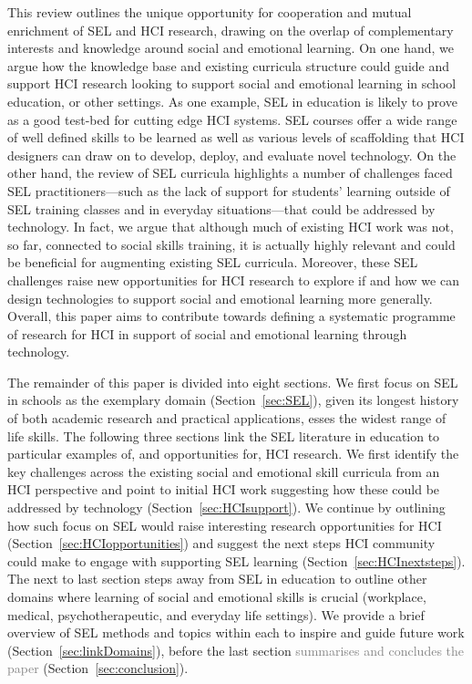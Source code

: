 \documentclass[prodmode,acmtochi]{acmsmall}
\newcommand{\rephrase}[1]{\textrm{\textrm{\textcolor{gray}{#1}}}}
\begin{document}
This review outlines the unique opportunity for cooperation and mutual enrichment of SEL and HCI research, drawing on the overlap of complementary interests and knowledge around social and emotional learning. 
%
On one hand, we argue how the knowledge base and existing curricula structure could guide and support HCI research looking to support social and emotional learning in school education, or other settings. As one example, SEL in education is likely to prove as a good test-bed for cutting edge HCI systems. SEL courses offer a wide range of well defined skills to be learned as well as various levels of scaffolding that HCI designers can draw on to develop, deploy, and evaluate novel technology. 
On the other hand, the review of SEL curricula highlights a number of challenges faced SEL practitioners---such as the lack of support for students' learning outside of SEL training classes and in everyday situations---that could be addressed by technology. In fact, we argue that although much of existing HCI work was not, so far, connected to social skills training, it is actually highly relevant and could be beneficial for augmenting existing SEL curricula. Moreover, these SEL challenges raise new opportunities for HCI research to explore if and how we can design technologies to support social and emotional learning more generally. 
%
Overall, this paper aims to contribute towards defining a systematic programme of research for HCI in support of social and emotional learning through technology. 

The remainder of this paper is divided into eight sections.  We first focus on SEL in schools as the exemplary domain (Section~\ref{sec:SEL}), given its longest history of both academic research and practical applications, esses the widest range of life skills. The following three sections link the SEL literature in education to particular examples of, and opportunities for, HCI research. We first  identify the key challenges across the existing social and emotional skill curricula from an HCI perspective and point to initial HCI work suggesting how these could be addressed by technology (Section~\ref{sec:HCIsupport}). We continue by outlining how such focus on SEL would raise interesting research opportunities for HCI (Section~\ref{sec:HCIopportunities}) and suggest the next steps HCI community could make to engage with supporting SEL learning (Section~\ref{sec:HCInextsteps}). 
The next to last section steps away from SEL in education to outline other domains where learning of social and emotional skills is crucial (workplace, medical, psychotherapeutic, and everyday life settings). We provide a brief overview of SEL methods and topics within each to inspire and guide future work (Section~\ref{sec:linkDomains}), before the last section \rephrase{summarises and concludes the paper} (Section~\ref{sec:conclusion}).  
\end{document}
